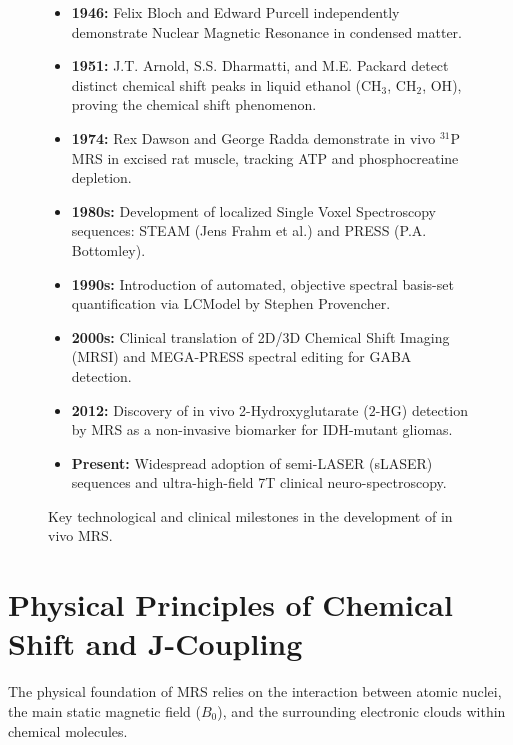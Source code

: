 \documentclass[11pt,a4paper]{article}
\begin{document}
\begin{figure}[htbp]
\centering
\begin{tcolorbox}[colback=teal!5!white,colframe=teal!60!black,title=\textbf{Chronological Milestones in the Evolution of In Vivo MRS},width=\linewidth]
\small
\begin{itemize}[leftmargin=1.5em]
    \item \textbf{1946:} Felix Bloch and Edward Purcell independently demonstrate Nuclear Magnetic Resonance in condensed matter.
    \item \textbf{1951:} J.T. Arnold, S.S. Dharmatti, and M.E. Packard detect distinct chemical shift peaks in liquid ethanol ($\text{CH}_3$, $\text{CH}_2$, $\text{OH}$), proving the chemical shift phenomenon.
    \item \textbf{1974:} Rex Dawson and George Radda demonstrate in vivo $^{31}\text{P}$ MRS in excised rat muscle, tracking ATP and phosphocreatine depletion.
    \item \textbf{1980s:} Development of localized Single Voxel Spectroscopy sequences: STEAM (Jens Frahm et al.) and PRESS (P.A. Bottomley).
    \item \textbf{1990s:} Introduction of automated, objective spectral basis-set quantification via LCModel by Stephen Provencher.
    \item \textbf{2000s:} Clinical translation of 2D/3D Chemical Shift Imaging (MRSI) and MEGA-PRESS spectral editing for GABA detection.
    \item \textbf{2012:} Discovery of in vivo 2-Hydroxyglutarate ($2\text{-HG}$) detection by MRS as a non-invasive biomarker for IDH-mutant gliomas.
    \item \textbf{Present:} Widespread adoption of semi-LASER (sLASER) sequences and ultra-high-field 7T clinical neuro-spectroscopy.
\end{itemize}
\end{tcolorbox}
\caption{Key technological and clinical milestones in the development of in vivo MRS.}
\label{fig:mrs_milestones}
\end{figure}

\section{Physical Principles of Chemical Shift and J-Coupling}
The physical foundation of MRS relies on the interaction between atomic nuclei, the main static magnetic field ($B_0$), and the surrounding electronic clouds within chemical molecules.
\end{document}
